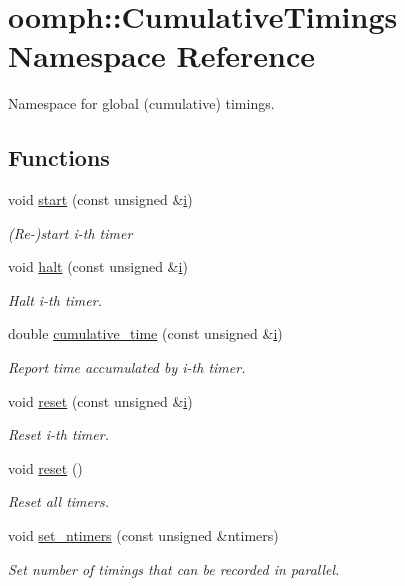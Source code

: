 \hypertarget{namespaceoomph_1_1CumulativeTimings}{}\section{oomph\+:\+:Cumulative\+Timings Namespace Reference}
\label{namespaceoomph_1_1CumulativeTimings}


Namespace for global (cumulative) timings.  


\subsection*{Functions}
\begin{DoxyCompactItemize}
\item 
void \hyperlink{namespaceoomph_1_1CumulativeTimings_aeafe5cb81741d54561e4b62572a1e3df}{start} (const unsigned \&\hyperlink{cfortran_8h_adb50e893b86b3e55e751a42eab3cba82}{i})
\begin{DoxyCompactList}\small\item\em (Re-\/)start i-\/th timer \end{DoxyCompactList}\item 
void \hyperlink{namespaceoomph_1_1CumulativeTimings_ab64f3634df4fbe6790069dcc06fdc0bc}{halt} (const unsigned \&\hyperlink{cfortran_8h_adb50e893b86b3e55e751a42eab3cba82}{i})
\begin{DoxyCompactList}\small\item\em Halt i-\/th timer. \end{DoxyCompactList}\item 
double \hyperlink{namespaceoomph_1_1CumulativeTimings_a33447b850b466ef8247b14af6623e07f}{cumulative\+\_\+time} (const unsigned \&\hyperlink{cfortran_8h_adb50e893b86b3e55e751a42eab3cba82}{i})
\begin{DoxyCompactList}\small\item\em Report time accumulated by i-\/th timer. \end{DoxyCompactList}\item 
void \hyperlink{namespaceoomph_1_1CumulativeTimings_a843f5485fc01485965e5547f61ac069f}{reset} (const unsigned \&\hyperlink{cfortran_8h_adb50e893b86b3e55e751a42eab3cba82}{i})
\begin{DoxyCompactList}\small\item\em Reset i-\/th timer. \end{DoxyCompactList}\item 
void \hyperlink{namespaceoomph_1_1CumulativeTimings_a15855a46d3acb353e3ca84c8d696d57d}{reset} ()
\begin{DoxyCompactList}\small\item\em Reset all timers. \end{DoxyCompactList}\item 
void \hyperlink{namespaceoomph_1_1CumulativeTimings_a49a6558826c7842f0e14dbdaccc3ed01}{set\+\_\+ntimers} (const unsigned \&ntimers)
\begin{DoxyCompactList}\small\item\em Set number of timings that can be recorded in parallel. \end{DoxyCompactList}\end{DoxyCompactItemize}
